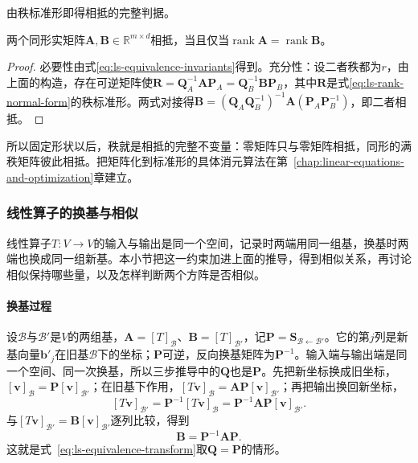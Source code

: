 由秩标准形即得相抵的完整判据。
\begin{theorem}[相抵判据]
\label{thm:ls-equivalence-criterion}
两个同形实矩阵$\bm A,\bm B\in\mathbb R^{m\times d}$相抵，当且仅当$\operatorname{rank}\bm A=\operatorname{rank}\bm B$。
\end{theorem}
\begin{proof}
必要性由式\eqref{eq:ls-equivalence-invariants}得到。充分性：设二者秩都为$r$，由上面的构造，存在可逆矩阵使$\bm R=\bm Q_A^{-1}\bm A\bm P_A=\bm Q_B^{-1}\bm B\bm P_B$，其中$\bm R$是式\eqref{eq:ls-rank-normal-form}的秩标准形。两式对接得$\bm B=(\bm Q_A\bm Q_B^{-1})^{-1}\bm A(\bm P_A\bm P_B^{-1})$，即二者相抵。
\end{proof}
所以固定形状以后，秩就是相抵的完整不变量：零矩阵只与零矩阵相抵，同形的满秩矩阵彼此相抵。把矩阵化到标准形的具体消元算法在第~\ref{chap:linear-equations-and-optimization}章建立。

\subsubsection{线性算子的换基与相似}
\label{sec:ls-similarity}
\label{sec:ls-matrix-equivalences}

线性算子$T:V\to V$的输入与输出是同一个空间，记录时两端用同一组基，换基时两端也换成同一组新基。本小节把这一约束加进上面的推导，得到相似关系，再讨论相似保持哪些量，以及怎样判断两个方阵是否相似。

\paragraph{换基过程}
设$\mathcal B$与$\mathcal B'$是$V$的两组基，$\bm A=[T]_{\mathcal B}$、$\bm B=[T]_{\mathcal B'}$，记$\bm P=\bm S_{\mathcal B\leftarrow\mathcal B'}$。它的第$j$列是新基向量$\bm b'_j$在旧基$\mathcal B$下的坐标；$\bm P$可逆，反向换基矩阵为$\bm P^{-1}$。输入端与输出端是同一个空间、同一次换基，所以三步推导中的$\bm Q$也是$\bm P$。先把新坐标换成旧坐标，$[\bm v]_{\mathcal B}=\bm P[\bm v]_{\mathcal B'}$；在旧基下作用，$[T\bm v]_{\mathcal B}=\bm A\bm P[\bm v]_{\mathcal B'}$；再把输出换回新坐标，
\[
 [T\bm v]_{\mathcal B'}=\bm P^{-1}[T\bm v]_{\mathcal B}=\bm P^{-1}\bm A\bm P[\bm v]_{\mathcal B'}.
\]
与$[T\bm v]_{\mathcal B'}=\bm B[\bm v]_{\mathcal B'}$逐列比较，得到
\begin{equation}
 \bm B=\bm P^{-1}\bm A\bm P.
 \label{eq:linear-algebra-similarity-change-basis}
\end{equation}
这就是式~\eqref{eq:ls-equivalence-transform}取$\bm Q=\bm P$的情形。

